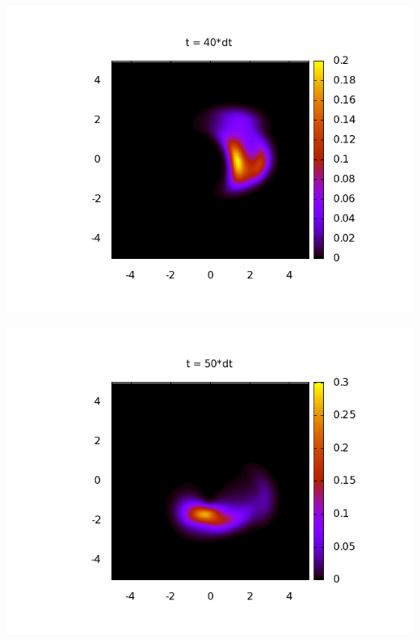 \begin{center}
\begin{minipage}[t]{.49\textwidth}
 \includegraphics[width=1\linewidth]{pictures/Poincare_40dt.png}
\end{minipage}
\begin{minipage}[t]{.49\textwidth}
 \includegraphics[width=1\linewidth]{pictures/Poincare_50dt.png}
\end{minipage}
\end{center}


